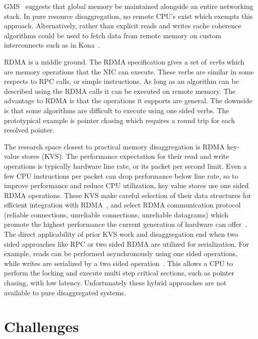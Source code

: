 GMS~\cite{gms} suggests that global memory be maintained alongside an entire
networking stack. In pure resource disaggregation, no remote CPU's exist which
exempts this approach.  Alternatively, rather than explicit reads and writes
cache coherence algorithms could be used to fetch data from remote memory on
custom interconnects such as in Kona~\cite{kona}.

RDMA is a middle ground. The RDMA specification gives a set of \textit{verbs}
which are memory operations that the NIC can execute. These verbs are similar in
some respects to RPC calls, or simple instructions. As long as an algorithm can
be described using the RDMA calls it can be executed on remote memory. The
advantage to RDMA is that the operations it supports are general. The downside
is that some algorithms are difficult to execute using one sided verbs. The
prototypical example is pointer chasing which requires a round trip for each
resolved pointer.

The research space closest to practical memory disaggregation is RDMA key-value
stores (KVS). The performance expectation for their read and write operations is
typically hardware line rate, or its packet per second limit. Even a few CPU
instructions per packet can drop performance below line rate, so to improve
performance and reduce CPU utilization, key value stores use one sided RDMA
operations. These KVS make careful selection of their data structures for
efficient integration with RDMA~\cite{hopscotch,cuckoo}, and select RDMA
communication protocol (reliable connections, unreliable connections, unreliable
datagrams) which promote the highest performance the current generation of
hardware can offer~\cite{herd,storm}. The direct applicability of prior KVS work
and disaggregation end when two sided approaches like RPC or two sided RDMA are
utilized for serialization. For example, reads can be performed asynchronously
using one sided operations, while writes are serialized by a two sided
operation~\cite{pilaf}. This allows a CPU to perform the locking and execute
multi step critical sections, such as pointer chasing, with low latency.
Unfortunately these hybrid approaches are not available to pure disaggregated
systems.


\section{Challenges}

